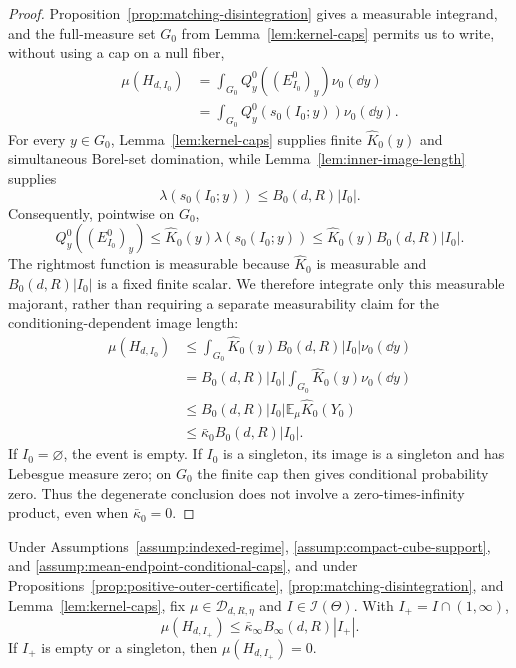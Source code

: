 \begin{proof}
Proposition~\ref{prop:matching-disintegration} gives a measurable integrand,
and the full-measure set $G_0$ from Lemma~\ref{lem:kernel-caps} permits us to
write, without using a cap on a null fiber,
\[
\begin{aligned}
\mu(H_{d,I_0})
&=\int_{G_0}Q^0_y((E^0_{I_0})_y)\nu_0(\dd y)\\
&=\int_{G_0}Q^0_y(s_0(I_0;y))\nu_0(\dd y).
\end{aligned}
\]
For every $y\in G_0$, Lemma~\ref{lem:kernel-caps} supplies finite
$\widehat K_0(y)$ and simultaneous Borel-set domination, while
Lemma~\ref{lem:inner-image-length} supplies
\[
\lambda(s_0(I_0;y))\leq B_0(d,R)|I_0|.
\]
Consequently, pointwise on $G_0$,
\[
Q^0_y((E^0_{I_0})_y)
\leq\widehat K_0(y)\lambda(s_0(I_0;y))
\leq\widehat K_0(y)B_0(d,R)|I_0|.
\]
The rightmost function is measurable because $\widehat K_0$ is measurable
and $B_0(d,R)|I_0|$ is a fixed finite scalar.  We therefore integrate only
this measurable majorant, rather than requiring a separate measurability
claim for the conditioning-dependent image length:
\[
\begin{aligned}
\mu(H_{d,I_0})
&\leq\int_{G_0}\widehat K_0(y)B_0(d,R)|I_0|\nu_0(\dd y)\\
&= B_0(d,R)|I_0|\int_{G_0}\widehat K_0(y)\nu_0(\dd y)\\
&\leq B_0(d,R)|I_0|\mathbb E_\mu\widehat K_0(Y_0)\\
&\leq\bar\kappa_0B_0(d,R)|I_0|.
\end{aligned}
\]
If $I_0=\varnothing$, the event is empty.  If $I_0$ is a singleton, its
image is a singleton and has Lebesgue measure zero; on $G_0$ the finite cap
then gives conditional probability zero.  Thus the degenerate conclusion
does not involve a zero-times-infinity product, even when
$\bar\kappa_0=0$.
\end{proof}

\begin{proposition}
\label{prop:positive-chart-probability}
Under Assumptions~\ref{assump:indexed-regime},
\ref{assump:compact-cube-support}, and
\ref{assump:mean-endpoint-conditional-caps}, and under
Propositions~\ref{prop:positive-outer-certificate},
\ref{prop:matching-disintegration}, and Lemma~\ref{lem:kernel-caps}, fix
$\mu\in\mathcal D_{d,R,\eta}$ and $I\in\mathcal I(\Theta)$.  With
$I_+=I\cap(1,\infty)$,
\[
\mu(H_{d,I_+})\leq\bar\kappa_\infty B_\infty(d,R)|I_+|.
\]
If $I_+$ is empty or a singleton, then $\mu(H_{d,I_+})=0$.
\end{proposition}

